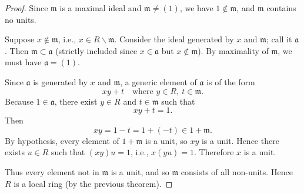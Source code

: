 \begin{proof}
    Since \( \mathfrak{m} \) is a maximal ideal and \( \mathfrak{m} \neq (1) \), we have \( 1 \notin \mathfrak{m} \), and \( \mathfrak{m} \) contains no units.

Suppose \( x \notin \mathfrak{m} \), i.e., \( x \in R \smallsetminus \mathfrak{m} \). Consider the ideal generated by \( x \) and \( \mathfrak{m} \); call it \( \mathfrak{a} \). Then \( \mathfrak{m} \subset \mathfrak{a} \) (strictly included since \( x \in \mathfrak{a} \) but \( x \notin \mathfrak{m} \)). By maximality of \( \mathfrak{m} \), we must have \( \mathfrak{a} = (1) \).

Since \( \mathfrak{a} \) is generated by \( x \) and \( \mathfrak{m} \), a generic element of \( \mathfrak{a} \) is of the form
\[
x y + t \quad \text{where } y \in R,\ t \in \mathfrak{m}.
\]
Because \( 1 \in \mathfrak{a} \), there exist \( y \in R \) and \( t \in \mathfrak{m} \) such that
\[
x y + t = 1.
\]
Then
\[
x y = 1 - t = 1 + (-t) \in 1 + \mathfrak{m}.
\]
By hypothesis, every element of \( 1 + \mathfrak{m} \) is a unit, so \( x y \) is a unit. Hence there exists \( u \in R \) such that \( (x y) u = 1 \), i.e., \( x (y u) = 1 \). Therefore \( x \) is a unit.

Thus every element not in \( \mathfrak{m} \) is a unit, and so \( \mathfrak{m} \) consists of all non-units. Hence \( R \) is a local ring (by the previous theorem).
\end{proof}
